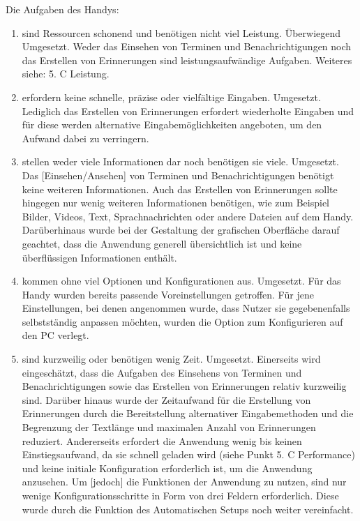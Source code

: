 \begin{enumerate}
\begin{enumerate}[label*={\arabic*}]
		\end{enumerate}
		\myNewSection%
		Die Aufgaben des Handys:%
		\begin{enumerate}[label*={\arabic*}]
			\item sind Ressourcen schonend und benötigen nicht viel Leistung.\newline%
				Überwiegend Umgesetzt. Weder das Einsehen von Terminen und Benachrichtigungen noch das Erstellen von Erinnerungen sind leistungsaufwändige Aufgaben. Weiteres siehe: 5. C Leistung.
			\item erfordern keine schnelle, präzise oder vielfältige Eingaben.\newline%
				Umgesetzt. Lediglich das Erstellen von Erinnerungen erfordert wiederholte Eingaben und für diese werden alternative Eingabemöglichkeiten angeboten, um den Aufwand dabei zu verringern. 
			\item stellen weder viele Informationen dar noch benötigen sie viele.\newline%
				Umgesetzt. Das [Einsehen/Ansehen] von Terminen und Benachrichtigungen benötigt keine weiteren Informationen. Auch das Erstellen von Erinnerungen sollte hingegen nur wenig weiteren Informationen benötigen, wie zum Beispiel Bilder, Videos, Text, Sprachnachrichten oder andere Dateien auf dem Handy. Darüberhinaus wurde bei der Gestaltung der grafischen Oberfläche darauf geachtet, dass die Anwendung generell übersichtlich ist und keine überflüssigen Informationen enthält.%
			\item kommen ohne viel Optionen und Konfigurationen aus.\newline%
				Umgesetzt. Für das Handy wurden bereits passende Voreinstellungen getroffen. Für jene Einstellungen, bei denen angenommen wurde, dass Nutzer sie gegebenenfalls selbstständig anpassen möchten, wurden die Option zum Konfigurieren auf den PC verlegt.
			\item sind kurzweilig oder benötigen wenig Zeit.\newline%
				Umgesetzt. Einerseits wird eingeschätzt, dass die Aufgaben des Einsehens von Terminen und Benachrichtigungen sowie das Erstellen von Erinnerungen relativ kurzweilig sind. Darüber hinaus wurde der Zeitaufwand für die Erstellung von Erinnerungen durch die Bereitstellung alternativer Eingabemethoden und die Begrenzung der Textlänge und maximalen Anzahl von Erinnerungen reduziert. Andererseits erfordert die Anwendung wenig bis keinen Einstiegsaufwand, da sie schnell geladen wird (siehe Punkt 5. C Performance) und keine initiale Konfiguration erforderlich ist, um die Anwendung anzusehen. Um [jedoch] die Funktionen der Anwendung zu nutzen, sind nur wenige Konfigurationsschritte in Form von drei Feldern erforderlich. Diese wurde durch die Funktion des \glqq Automatischen Setups\grqq{} noch weiter vereinfacht.

\end{enumerate}
\end{enumerate}
